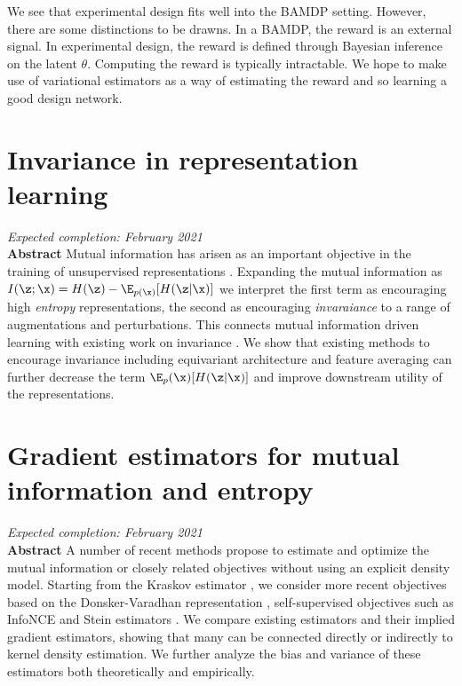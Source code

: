 We see that experimental design fits well into the BAMDP setting. However, there are some distinctions to be drawns. In a BAMDP, the reward is an external signal. In experimental design, the reward is defined through Bayesian inference on the latent $\theta$. Computing the reward is typically intractable. We hope to make use of variational estimators \cite{foster2019unified} as a way of estimating the reward and so learning a good design network.

\section{Invariance in representation learning}
\textit{Expected completion: February 2021} \\
\textbf{Abstract} Mutual information has arisen as an important objective in the training of unsupervised representations \cite{oord2018representation}. Expanding the mutual information as $I(\z;\x) = H(\z) - \E_{p(\x)}[H(\z|\x)]$ we interpret the first term as encouraging high \textit{entropy} representations, the second as encouraging \textit{invaraiance} to a range of augmentations and perturbations. This connects mutual information driven learning with existing work on invariance \cite{cohen2019general,lyle2020benefits}. We show that existing methods to encourage invariance including equivariant architecture and feature averaging can further decrease the term $\E_p(\x)[H(\z|\x)]$ and improve downstream utility of the representations.

\section{Gradient estimators for mutual information and entropy}
\textit{Expected completion: February 2021} \\
\textbf{Abstract} A number of recent methods propose to estimate and optimize the mutual information or closely related objectives without using an explicit density model. Starting from the Kraskov estimator \cite{kraskov2004estimating}, we consider more recent objectives based on the Donsker-Varadhan representation \cite{belghazi2018mine}, self-supervised objectives such as InfoNCE \cite{oord2018representation} and Stein estimators \cite{li2017gradient,shi2018spectral}. We compare existing estimators and their implied gradient estimators, showing that many can be connected directly or indirectly to kernel density estimation. We further analyze the bias and variance of these estimators both theoretically and empirically. 


